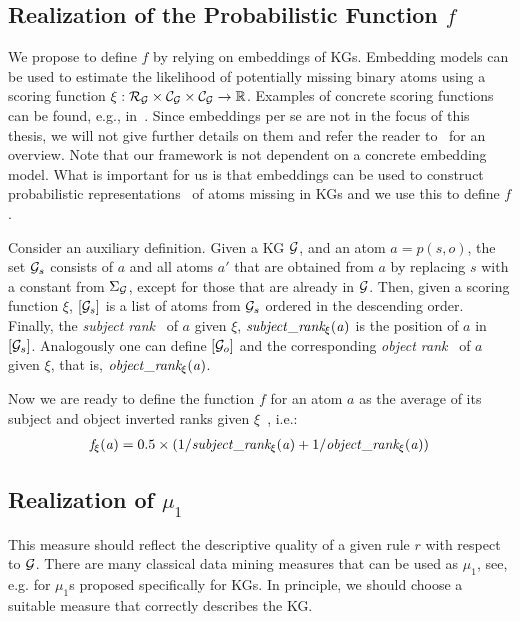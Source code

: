 \subsection{Realization of the Probabilistic Function $f$}
We propose to define $f$ by relying on embeddings of KGs.
Embedding models can be used to estimate the likelihood of potentially missing binary atoms
using a scoring function $\mathit{\xi: \mathcal{R}_{\mathcal{G}} \times \mathcal{C}_{\mathcal{G}} \times \mathcal{C}_{\mathcal{G}} \rightarrow \mathbb{R}}$.
Examples of concrete scoring functions can be found, e.g., in~\cite{DBLP:journals/tkde/WangMWG17}.
Since embeddings per se are not in the focus of this thesis,
we will not give further details on them and refer the reader to~\cite{DBLP:journals/tkde/WangMWG17} for an overview.
Note that our framework is not dependent on a concrete embedding model. 
What is important for us is that embeddings can be used to construct probabilistic representations~\cite{DBLP:conf/aaai/NickelRP16} of atoms missing in KGs and we use this to define $f$.

Consider an auxiliary definition. Given a KG $\mathcal{G}$, and an atom $a=p(s,o)$, the set $\mathcal{G}_s$ consists of $a$ and all atoms $a'$ that are obtained from $a$ by replacing $s$ with a constant from $\Sigma_\mathcal{G}$, except for those that are already in $\mathcal{G}$. 
Then, given a scoring function $\xi$, $[\mathcal{G}_s]$ is a list of atoms from $\mathcal{G}_s$ ordered in the descending order.
Finally, the \emph{subject rank}~\cite{DBLP:journals/corr/abs-1301-3485} of $a$ given $\xi$, $\mathit{subject\_rank_\xi(a)}$ is the position of $a$ in $[\mathcal{G}_s]$. 
Analogously one can define $[\mathcal{G}_o]$ and the corresponding 
\emph{object rank}~\cite{DBLP:journals/corr/abs-1301-3485} of $a$ given $\xi$, that is, $\mathit{object\_rank_\xi(a)}$. 

Now we are ready to define the function $f$ for an atom $a$ %
as the average of its subject and object inverted ranks given $\xi$~\cite{DBLP:journals/corr/abs-1301-3485}, i.e.:
\begin{align}
\label{eq:f}
\mathit{f_\xi(a)} = 0.5\times(1/\mathit{subject\_rank_\xi(a)}+ 1/\mathit{object\_rank_\xi(a)})
\end{align}



\subsection{Realization of $\mu_1$}
This measure should reflect the descriptive quality of a given rule $r$ with respect to $\mathcal{G}$.
There are many classical data mining measures that can be used as $\mu_1$, see, e.g. \cite{DBLP:conf/eurogp/MinhdNT18,amie,carl,measureskg} for $\mu_1$s proposed specifically for KGs. In principle, we should choose a suitable measure that correctly describes the KG.

